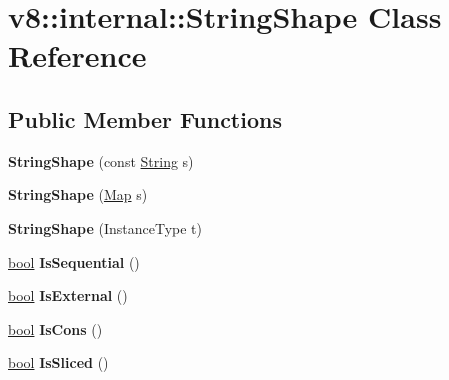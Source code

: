 \hypertarget{classv8_1_1internal_1_1StringShape}{}\section{v8\+:\+:internal\+:\+:String\+Shape Class Reference}
\label{classv8_1_1internal_1_1StringShape}
\subsection*{Public Member Functions}
\begin{DoxyCompactItemize}
\item 
\mbox{\label{classv8_1_1internal_1_1StringShape_aa6bd4019e63c30762f1d5f79e2f1c954}} 
{\bfseries String\+Shape} (const \mbox{\hyperlink{classv8_1_1internal_1_1String}{String}} s)
\item 
\mbox{\label{classv8_1_1internal_1_1StringShape_a3800900c402fda8f65f29e25740cf410}} 
{\bfseries String\+Shape} (\mbox{\hyperlink{classv8_1_1internal_1_1Map}{Map}} s)
\item 
\mbox{\label{classv8_1_1internal_1_1StringShape_a44e55a31a3a4df2927f55c9113c760f3}} 
{\bfseries String\+Shape} (Instance\+Type t)
\item 
\mbox{\label{classv8_1_1internal_1_1StringShape_a2113d2913d424137c9a49369da4a9d21}} 
\mbox{\hyperlink{classbool}{bool}} {\bfseries Is\+Sequential} ()
\item 
\mbox{\label{classv8_1_1internal_1_1StringShape_a6c593de583670230edaf383c3caa8eaa}} 
\mbox{\hyperlink{classbool}{bool}} {\bfseries Is\+External} ()
\item 
\mbox{\label{classv8_1_1internal_1_1StringShape_a4e1fe5fa24ff6c66c1236454a298026d}} 
\mbox{\hyperlink{classbool}{bool}} {\bfseries Is\+Cons} ()
\item 
\mbox{\label{classv8_1_1internal_1_1StringShape_a1120ac2556528b760fabfb642b8e5dec}} 
\mbox{\hyperlink{classbool}{bool}} {\bfseries Is\+Sliced} ()

\end{DoxyCompactItemize}

